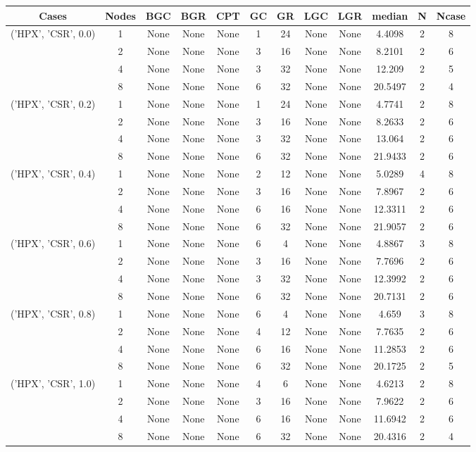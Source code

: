 \begin{tabular}{cccccccccccc}
\hline
Cases & Nodes& BGC& BGR& CPT& GC& GR& LGC& LGR& median & N & Ncase \\
\hline
\multirow{4}{*}{('HPX', 'CSR', 0.0)}& 1& None& None& None& 1& 24& None& None& 4.4098& 2& 8\\
& 2& None& None& None& 3& 16& None& None& 8.2101& 2& 6\\
& 4& None& None& None& 3& 32& None& None& 12.209& 2& 5\\
& 8& None& None& None& 6& 32& None& None& 20.5497& 2& 4\\
\hline
\multirow{4}{*}{('HPX', 'CSR', 0.2)}& 1& None& None& None& 1& 24& None& None& 4.7741& 2& 8\\
& 2& None& None& None& 3& 16& None& None& 8.2633& 2& 6\\
& 4& None& None& None& 3& 32& None& None& 13.064& 2& 6\\
& 8& None& None& None& 6& 32& None& None& 21.9433& 2& 6\\
\hline
\multirow{4}{*}{('HPX', 'CSR', 0.4)}& 1& None& None& None& 2& 12& None& None& 5.0289& 4& 8\\
& 2& None& None& None& 3& 16& None& None& 7.8967& 2& 6\\
& 4& None& None& None& 6& 16& None& None& 12.3311& 2& 6\\
& 8& None& None& None& 6& 32& None& None& 21.9057& 2& 6\\
\hline
\multirow{4}{*}{('HPX', 'CSR', 0.6)}& 1& None& None& None& 6& 4& None& None& 4.8867& 3& 8\\
& 2& None& None& None& 3& 16& None& None& 7.7696& 2& 6\\
& 4& None& None& None& 3& 32& None& None& 12.3992& 2& 6\\
& 8& None& None& None& 6& 32& None& None& 20.7131& 2& 6\\
\hline
\multirow{4}{*}{('HPX', 'CSR', 0.8)}& 1& None& None& None& 6& 4& None& None& 4.659& 3& 8\\
& 2& None& None& None& 4& 12& None& None& 7.7635& 2& 6\\
& 4& None& None& None& 6& 16& None& None& 11.2853& 2& 6\\
& 8& None& None& None& 6& 32& None& None& 20.1725& 2& 5\\
\hline
\multirow{4}{*}{('HPX', 'CSR', 1.0)}& 1& None& None& None& 4& 6& None& None& 4.6213& 2& 8\\
& 2& None& None& None& 3& 16& None& None& 7.9622& 2& 6\\
& 4& None& None& None& 6& 16& None& None& 11.6942& 2& 6\\
& 8& None& None& None& 6& 32& None& None& 20.4316& 2& 4\\
\hline
\end{tabular}




